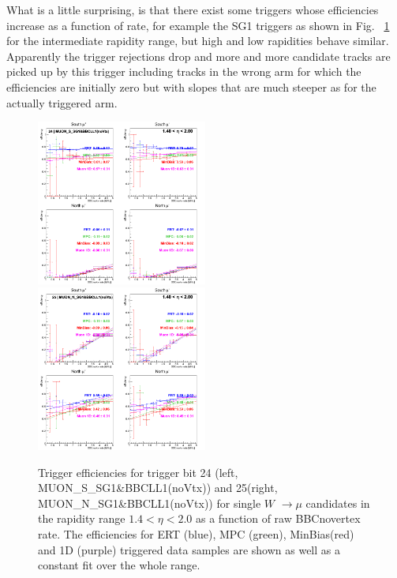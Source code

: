What is a little surprising, is that there exist some triggers whose
efficiencies increase as a function of rate, for example the SG1 triggers as
shown in Fig.~ \ref{fig:run13_trigeffirate_trig2425} for the intermediate
rapidity range, but high and low rapidities behave similar. Apparently the
trigger rejections drop and more and more candidate tracks are picked up by this
trigger including tracks in the wrong arm for which the efficiencies are
initially zero but with slopes that are much steeper as for the actually
triggered arm. 

\begin{figure}[h!]

  \centering

  \includegraphics[width=0.5\textwidth]{./figures/run13_trigeffirate_eta1_trig24_lin.png}
  \includegraphics[width=0.5\textwidth]{./figures/run13_trigeffirate_eta1_trig25_lin.png}
  \caption{\label{fig:run13_trigeffirate_trig2425} Trigger efficiencies for trigger bit 24 (left, MUON\_S\_SG1\&BBCLL1(noVtx)) and 25(right, MUON\_N\_SG1\&BBCLL1(noVtx)) for single $W$ $\rightarrow \mu$ candidates in the rapidity range $ 1.4 < \eta < 2.0$ as a function of raw BBCnovertex rate. The efficiencies for ERT (blue), MPC (green), MinBias(red) and 1D (purple) triggered data samples are shown as well as a constant fit over the whole range.}

\end{figure}
